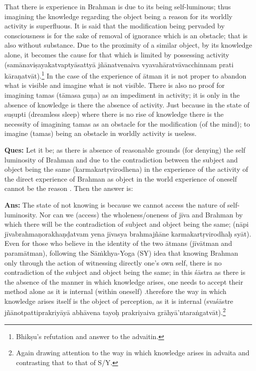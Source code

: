 That there is experience in Brahman is due to its being self-luminous; thus imagining the knowledge regarding the object being a reason for its worldly activity is superfluous. It is said that the modification being pervaded by consciousness   is for the sake of removal of ignorance which is an obstacle; that is also without substance. Due to the proximity of a similar object, by its knowledge alone, it becomes the cause for that which is limited by possessing activity (samānaviṣayakatvaptyāsattyā jñānatvenaiva vyavahāratvāvacchinnam prati kāraṇatvāt).\footnote{Bhikṣu’s refutation and answer to the advaitin.} In the case of the experience of ātman it is not proper to abandon what is visible and imagine what is not visible. There is also no proof for imagining tamas (tāmasa guṇa) as an impediment in activity; it is only in the absence of knowledge is there the absence of activity. Just because in the state of suṣupti (dreamless sleep) where there is no rise of knowledge there is the necessity of imagining tamas as an obstacle for the modification (of the mind); to imagine (tamas) being an obstacle in worldly activity is useless.

\textbf{Ques:} Let it be; as there is absence of reasonable grounds (for denying) the self luminosity of Brahman and due to the contradiction between the subject and object being the same (karmakartṛvirodhena) in the experience of the activity of the direct experience of Brahman as object in the world experience of oneself cannot be the reason . Then the answer is: 

\textbf{Ans:} The state of not knowing is because we cannot access the nature of self-luminosity. Nor can we (access) the wholeness/oneness of jīva and Brahman by which there will be the contradiction of subject and object being the same;  (nāpi jīvabrahmaṇorakhaṇḍatvam yena jīvasya brahmajñāne karmakartṛvirodhaḥ syāt). Even for those who believe in the identity of the two ātmans (jīvātman and paramātman), following the Sāṁkhya-Yoga (SY) idea that  knowing Brahman only through the action of witnessing directly one’s own self, there is no contradiction of the subject and object being the same; in this śāstra as there is the absence of the manner in which knowledge arises, one needs to accept their method alone as it is internal (within oneself) .therefore the way in which knowledge arises itself is the object of perception, as it is internal (svaśāstre jñānotpattiprakriyāyā abhāvena tayoḥ prakriyaiva grāhyā’ntaraṅgatvāt).\footnote{Again drawing attention to the way in which knowledge arises in advaita and contrasting that to that of S/Y.}

